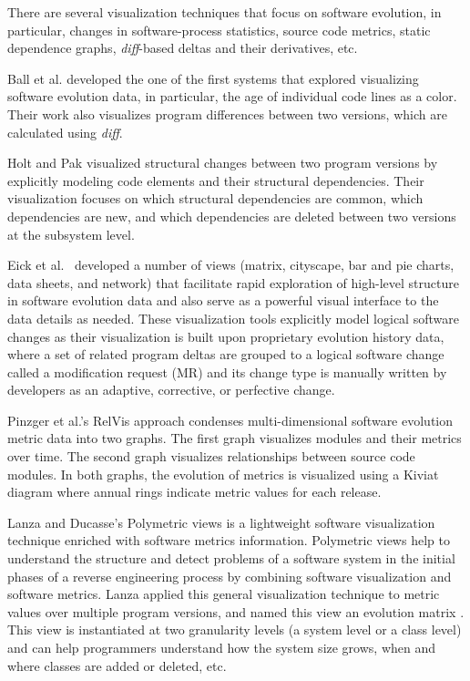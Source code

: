 \documentclass[runningheads,a4paper]{llncs}
\begin{document}
There are several visualization techniques that focus on software evolution, in particular, changes in software-process statistics, source code metrics, static dependence graphs, {\it diff}-based deltas and their derivatives, etc. 

Ball et al. \cite{Ball1996} developed the one of the first systems that \cite{Ball1996} explored visualizing software evolution data, in particular, the age of individual code lines as a color. Their work also visualizes program differences between two versions, which are calculated using {\it diff}.

Holt and Pak \cite{Holt1996} visualized structural changes between two program versions by explicitly modeling code elements and their structural dependencies. Their visualization focuses on which structural dependencies are common, which dependencies are new, and which dependencies are deleted between two versions at the subsystem level. 


Eick et al.~\cite{Eick2002} developed a number of views (matrix, cityscape, bar and pie charts, data sheets, and network) that facilitate rapid exploration of high-level structure in software evolution data and also serve as a powerful visual interface to the data details as needed. These visualization tools explicitly model logical software changes as their visualization is built upon proprietary evolution history data, where a set of related program deltas are grouped to a logical software change called a modification request (MR) and its change type is manually written by developers as an adaptive, corrective, or perfective change. 

Pinzger et al.'s RelVis approach \cite{Pinzger05:sv} condenses multi-dimensional software evolution metric data into two graphs. The first graph visualizes modules and their metrics over time. The second graph visualizes relationships between source code modules. In both graphs, the evolution of metrics is visualized using a Kiviat diagram where annual rings indicate metric values for each release.

Lanza and Ducasse's Polymetric views \cite{Lanza2003} is a lightweight software visualization technique enriched with software metrics information. Polymetric views help to understand the structure and detect problems of a software system in the initial phases of a reverse engineering process by combining software visualization and software metrics. Lanza applied this general visualization technique to metric values over multiple program versions, and named this view an evolution matrix \cite{Lanza01:sv}. This view is instantiated at two granularity levels (a system level or a class level) and can help programmers understand how the system size grows, when and where classes are added or deleted, etc. 
\end{document}

